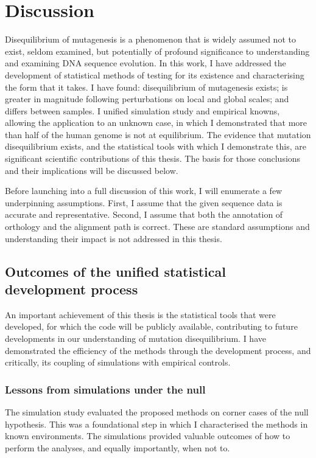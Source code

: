 \chapter{Discussion}

Disequilibrium of mutagenesis is a phenomenon that is widely assumed not to exist, seldom examined, but potentially of profound significance to understanding and examining DNA sequence evolution. In this work, I have addressed the development of statistical methods of testing for its existence and characterising the form that it takes. I have found: disequilibrium of mutagenesis exists; is greater in magnitude following perturbations on local and global scales; and differs between samples. I unified simulation study and empirical knowns, allowing the application to an unknown case, in which I demonstrated that more than half of the human genome is not at equilibrium. The evidence that mutation disequilibrium exists, and the statistical tools with which I demonstrate this, are significant scientific contributions of this thesis. The basis for those conclusions and their implications will be discussed below. 

Before launching into a full discussion of this work, I will enumerate a few underpinning assumptions. First, I assume that the given sequence data is accurate and representative. Second, I assume that both the annotation of orthology and the alignment path is correct. These are standard assumptions and understanding their impact is not addressed in this thesis. 

\section{Outcomes of the unified statistical development process}
An important achievement of this thesis is the statistical tools that were developed, for which the code will be publicly available, contributing to future developments in our understanding of mutation disequilibrium. I have demonstrated the efficiency of the methods through the development process, and critically, its coupling of simulations with empirical controls.

\subsection{Lessons from simulations under the null}
The simulation study evaluated the proposed methods on corner cases of the null hypothesis. This was a foundational step in which I characterised the methods in known environments. The simulations provided valuable outcomes of how to perform the analyses, and equally importantly, when not to. 


